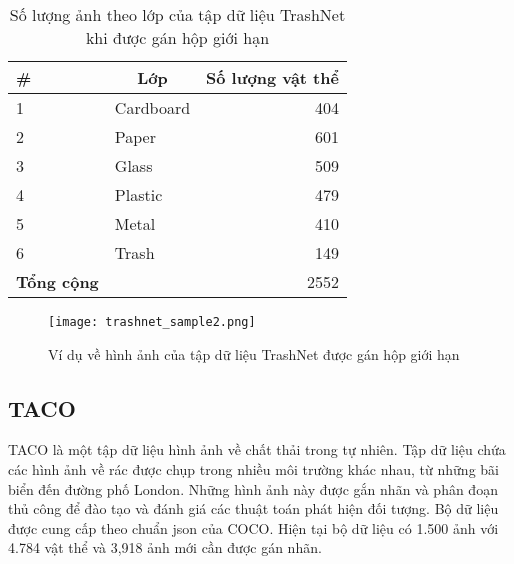 \documentclass[../the.tex]{subfiles}
\begin{document}
\begin{table}[!ht]
	\centering
	\caption{Số lượng ảnh theo lớp của tập dữ liệu TrashNet khi được gán hộp giới hạn}
	\begin{tabular}{|l|l|r|}
		\hline
		\multicolumn{1}{|l|}{
			\textbf{\#}}
		 & \multicolumn{1}{c|}{\textbf{Lớp}}
		 & \multicolumn{1}{c|}{\textbf{Số lượng vật thể}} \\
		\hline

		1
		 & Cardboard
		 & 404                                            \\
		\hline

		2
		 & Paper
		 & 601                                            \\
		\hline

		3
		 & Glass
		 & 509                                            \\
		\hline

		4
		 & Plastic
		 & 479                                            \\
		\hline

		5
		 & Metal
		 & 410                                            \\
		\hline

		6
		 & Trash
		 & 149                                            \\
		\hline


		\textbf{Tổng cộng}
		 &
		 & 2552                                           \\
		\hline
	\end{tabular}

	\label{tab:dataset1}
\end{table}

\begin{figure}[H]
	\centering
	\texttt{[image: trashnet\_sample2.png]}
	\caption{Ví dụ về hình ảnh của tập dữ liệu TrashNet được gán hộp giới hạn}
	\label{fig:dataset_1}
\end{figure}

\subsection{TACO}
\label{sec:TACO}
{\fontsize{13}{12} \selectfont

	TACO là một tập dữ liệu hình ảnh về chất thải trong tự nhiên. Tập dữ liệu chứa các hình ảnh về rác được chụp trong nhiều môi trường khác nhau, từ những bãi biển đến đường phố London. Những hình ảnh này được gắn nhãn và phân đoạn thủ công để đào tạo và đánh giá các thuật toán phát hiện đối tượng.
	Bộ dữ liệu được cung cấp
	theo chuẩn json của COCO. Hiện tại bộ dữ liệu có 1.500 ảnh với 4.784 vật thể
	và 3,918 ảnh mới cần được gán nhãn.

}
\end{document}
